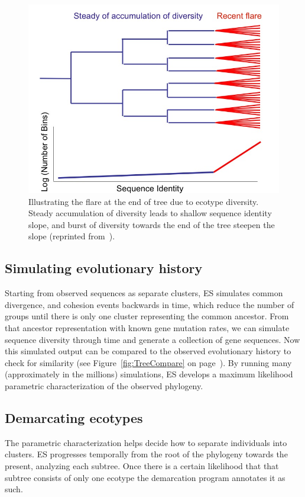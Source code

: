 \begin{figure}[h!]
\centering
\includegraphics[scale=0.45]{images/TreeFlare-CH2}
\caption[Illustrating the flare at the end of tree due to ecotype diversity.]{Illustrating the flare at the end of tree due to ecotype diversity. Steady accumulation of diversity leads to shallow sequence identity slope, and burst of diversity towards the end of the tree steepen the slope (reprinted from~\protect\cite{fredImage}).}
\label{fig:TreeFlare}
\end{figure}

\subsection*{Simulating evolutionary history}
Starting from observed sequences as separate clusters, ES simulates common divergence, and cohesion events backwards in time, which reduce the number of groups until there is only one cluster representing the common ancestor.
From that ancestor representation with known gene mutation rates, we can simulate sequence diversity through time and generate a collection of gene sequences.
Now this simulated output can be compared to the observed evolutionary history to check for similarity (see Figure~\ref{fig:TreeCompare} on page~\pageref{fig:TreeCompare}).
By running many (approximately in the millions) simulations, ES develops a maximum likelihood parametric characterization of the observed phylogeny. 

\subsection*{Demarcating ecotypes}
The parametric characterization helps decide how to separate individuals into clusters.
ES progresses temporally from the root of the phylogeny towards the present, analyzing each subtree.
Once there is a certain likelihood that that subtree consists of only one ecotype the demarcation program annotates it as such.


